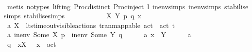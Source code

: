\begin{isabellebody}
\ \ \isamarkupfalse%
\ {\isacharparenleft}{\kern0pt}metis\ {\isacharparenleft}{\kern0pt}no{\isacharunderscore}{\kern0pt}types{\isacharcomma}{\kern0pt}\ lifting{\isacharparenright}{\kern0pt}\ Proc{\isacharunderscore}{\kern0pt}{\isasymtheta}{\isachardot}{\kern0pt}distinct{\isacharparenleft}{\kern0pt}{}{\isacharparenright}{\kern0pt}\ Proc{\isacharunderscore}{\kern0pt}{\isasymtheta}{\isachardot}{\kern0pt}inject{\isacharparenleft}{\kern0pt}{}{\isacharparenright}{\kern0pt}\ l{}\ in{\isacharunderscore}{\kern0pt}env{\isachardot}{\kern0pt}simps{\isacharparenleft}{\kern0pt}{}{\isacharparenright}{\kern0pt}\ in{\isacharunderscore}{\kern0pt}env{\isachardot}{\kern0pt}simps{\isacharparenleft}{\kern0pt}{}{\isacharparenright}{\kern0pt}\ stabilise{\isachardot}{\kern0pt}simps{\isacharparenleft}{\kern0pt}{}{\isacharparenright}{\kern0pt}\ stabilise{\isachardot}{\kern0pt}simps{\isacharparenleft}{\kern0pt}{}{\isacharparenright}{\kern0pt}{\isacharparenright}{\kern0pt}\isanewline
\ \ \isamarkupfalse%
\ \isamarkupfalse%
\ {\isacharminus}{\kern0pt}\isanewline
\ \ \ \ \isamarkupfalse%
\ X\ Y\ p\ q\ x\isanewline
\ \ \ \ \isamarkupfalse%
\ a{}{\isacharcolon}{\kern0pt}\ {\isacartoucheopen}X\ {\isasymsubseteq}\ lts{\isacharunderscore}{\kern0pt}timeout{\isachardot}{\kern0pt}visible{\isacharunderscore}{\kern0pt}actions\ tran{\isacharunderscore}{\kern0pt}mappable\ {\isacharparenleft}{\kern0pt}act\ {\isasymtau}{\isacharparenright}{\kern0pt}\ {\isacharparenleft}{\kern0pt}act\ t{\isacharparenright}{\kern0pt}{\isacartoucheclose}\isanewline
\ \ \ \ \isamarkupfalse%
\ a{}{\isacharcolon}{\kern0pt}\ {\isacartoucheopen}in{\isacharunderscore}{\kern0pt}env\ {\isacharparenleft}{\kern0pt}Some\ X{\isacharparenright}{\kern0pt}\ p\ {\isacharequal}{\kern0pt}\ in{\isacharunderscore}{\kern0pt}env\ {\isacharparenleft}{\kern0pt}Some\ Y{\isacharparenright}{\kern0pt}\ q{\isacartoucheclose}\isanewline
\ \ \ \ \isamarkupfalse%
\ a{}{\isacharcolon}{\kern0pt}\ {\isacartoucheopen}x\ {\isasymin}\ Y{\isacartoucheclose}\isanewline
\isanewline
\ \ \ \ \isamarkupfalse%
\ a{}\ \isamarkupfalse%
\ q{}{\isacharcolon}{\kern0pt}\ {\isacartoucheopen}{\isasymforall}\ x{\isasymin}X{\isachardot}{\kern0pt}\ {\isacharparenleft}{\kern0pt}{\isasymexists}\ {\isasymalpha}{\isachardot}{\kern0pt}\ x\ {\isacharequal}{\kern0pt}\ act\ {\isasymalpha}{\isacharparenright}{\kern0pt}{\isacartoucheclose}\isanewline

\end{isabellebody}
